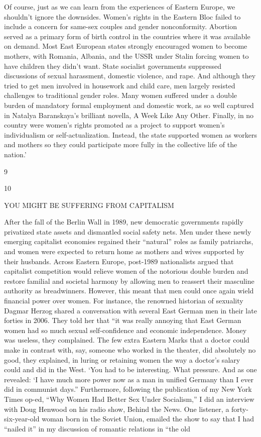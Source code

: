 Of course, just as we can learn from the experiences of Eastern Europe, we shouldn't ignore the downsides. Women’s rights in the Eastern Bloc failed to include a concern for same-sex couples and gender nonconformity. Abortion served as a primary form of birth control in the countries where it was available on demand. Most East European states strongly encouraged women to become mothers, with Romania, Albania, and the USSR under Stalin forcing women to have children they didn’t want. State socialist governments suppressed discussions of sexual harassment, domestic violence, and rape. And although they tried to get men involved in housework and child care, men largely resisted challenges to traditional gender roles. Many women suffered under a double burden of mandatory formal employment and domestic work, as so well captured in Natalya Baranskaya’s brilliant novella, A Week Like Any Other. Finally, in no country were women’s rights promoted as a project to support women’s individualism or self-actualization. Instead, the state supported women as workers and mothers so they could participate more fully in the collective life of the nation.’
 \par 
9
 \par 
10
 \par 
YOU MIGHT BE SUFFERING FROM CAPITALISM
 \par 
After the fall of the Berlin Wall in 1989, new democratic governments rapidly privatized state assets and dismantled social safety nets. Men under these newly emerging capitalist economies regained their “natural” roles as family patriarchs, and women were expected to return home as mothers and wives supported by their husbands. Across Eastern Europe, post-1989 nationalists argued that capitalist competition would relieve women of the notorious double burden and restore familial and societal harmony by allowing men to reassert their masculine authority as breadwinners. However, this meant that men could once again wield financial power over women. For instance, the renowned historian of sexuality Dagmar Herzog shared a conversation with several East German men in their late forties in 2006. They told her that “it was really annoying that East German women had so much sexual self-confidence and economic independence. Money was useless, they complained. The few extra Eastern Marks that a doctor could make in contrast with, say, someone who worked in the theater, did absolutely no good, they explained, in luring or retaining women the way a doctor’s salary could and did in the West. ‘You had to be interesting. What pressure. And as one revealed: ‘I have much more power now as a man in unified Germany than I ever did in communist days.” Furthermore, following the publication of my New York Times op-ed, “Why Women Had Better Sex Under Socialism,” I did an interview with Doug Henwood on his radio show, Behind the News. One listener, a forty-six-year-old woman born in the Soviet Union, emailed the show to say that I had “nailed it” in my discussion of romantic relations in “the old
